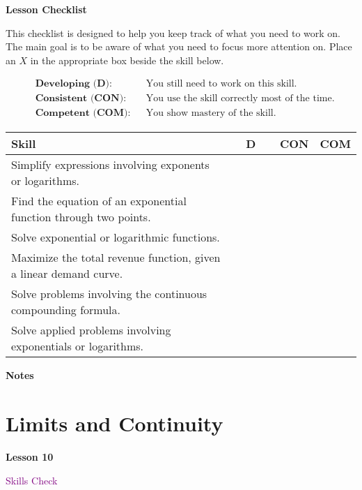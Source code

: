\documentclass[10pt]{book}
\theoremstyle{definition}
\theoremstyle{remark}
\begin{document}
\begin{large}
\noindent
\textbf{Lesson Checklist}
\bigskip

\noindent
This checklist is designed to help you keep track of what you need to work on. The main goal is to be aware of what you need to focus more attention on. Place an $X$ in the appropriate box beside the skill below. 
\bigskip

\noindent
\begin{align*}
&\textbf{Developing (D):} &&\textrm{You still need to work on this skill.}\\
&\textbf{Consistent (CON):} &&\textrm{You use the skill correctly most of the time.}\\
&\textbf{Competent (COM):} &&\textrm{You show mastery of the skill.} 
\end{align*}
\vfil

\begin{center}
\begin{tabular}{|l|l|l|l|}
\hline
\textbf{Skill} & \textbf{~~D~~} & \textbf{CON} & \textbf{COM} \\
\hline
Simplify expressions involving exponents or logarithms.&&&\\
\hline
Find the equation of an exponential function through two points.&&&\\
\hline
Solve exponential or logarithmic functions.&&&\\
\hline
Maximize the total revenue function, given a linear demand curve.&&&\\
\hline
Solve problems involving the continuous compounding formula.&&&\\
\hline
Solve applied problems involving exponentials or logarithms.&&&\\
\hline
\end{tabular}
\end{center}
 \vfil

\noindent
\textbf{Notes}
\end{large} \vfil
\newpage

\section{Limits and Continuity}
\begin{tcolorbox}[
  width=\textwidth,
  colback=gray!10, %
  colframe=white, %
  boxrule=0pt,    %
  left=1cm,       %
  right=1cm,      %
  sharp corners  %
]

\begin{minipage}[t]{0.5\textwidth}
  \Huge \textbf{Lesson 10}
\end{minipage}%
\hfill
\begin{minipage}[t]{0.5\textwidth}
  \Huge \textcolor{purple}{Skills Check}
\end{minipage}
\end{tcolorbox}
\end{document}

